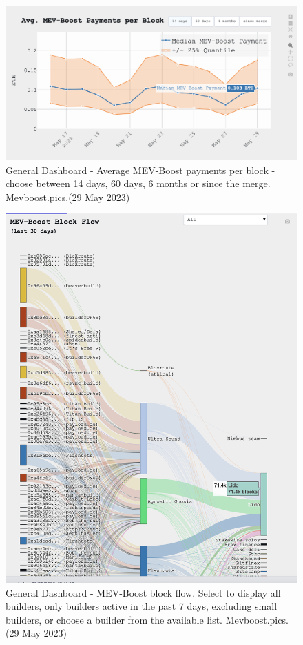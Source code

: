 \documentclass[UTF8]{article}
\begin{document}
\begin{figure}[htbp]
\begin{center}
\includegraphics[width=0.9\linewidth]{images/mevhome3}
\caption{General Dashboard -  Average MEV-Boost payments per block - choose between 14 days, 60 days, 6 months or since the merge. Mevboost.pics.(29 May 2023)}
\label{fig:mevhome3}
\end{center}
\end{figure}

\begin{figure}[htbp]
\begin{center}
\includegraphics[width=0.9\linewidth]{images/mevhome4}
\caption{General Dashboard - MEV-Boost block flow. Select to display all builders, only builders active in the past 7 days, excluding small builders, or choose  a builder from the available list. Mevboost.pics.(29 May 2023)}
\label{fig:mevhome4}
\end{center}
\end{figure}
\clearpage
\end{document}

